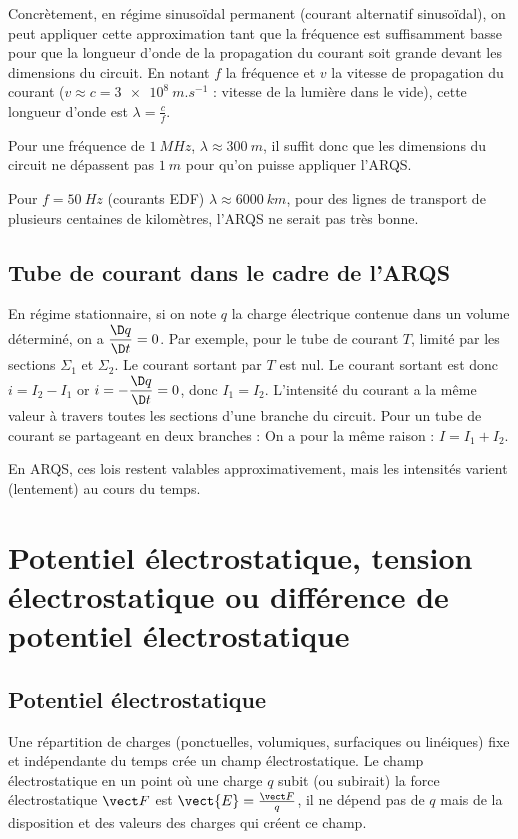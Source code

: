 Concrètement, en régime sinusoïdal permanent (courant alternatif sinusoïdal), on peut appliquer cette approximation tant que la fréquence est suffisamment basse pour que la longueur d'onde de la propagation du courant soit grande devant les dimensions du circuit. En notant $f$ la fréquence et $v$ la vitesse de propagation du courant ($v\approx c = \SI{3e8}{m.s^{-1}}$ : vitesse de la lumière dans le vide), cette longueur d'onde est  $\lambda = \frac{c}{f}$.

Pour une fréquence de $\SI{1}{MHz}$,  $\lambda \approx \SI{300}{m}$, il suffit donc que les dimensions du circuit ne dépassent pas $\SI{1}{m}$ pour qu'on puisse appliquer l'ARQS. 

Pour $f=\SI{50}{Hz}$ (courants EDF) $\lambda \approx \SI{6000}{km}$, pour des lignes de transport de plusieurs centaines de kilomètres, l'ARQS ne serait pas très bonne.

\subsection{Tube de courant dans le cadre de l'ARQS}
\label{chap9-subsec:TubedeCourantARQS}

En régime stationnaire, si on note $q$ la charge électrique contenue dans un volume déterminé, on a $\derived{q}{t}=0$. Par exemple, pour le tube de courant $T$, limité par les sections $\Sigma_1$ et $\Sigma_2$. Le courant sortant par $T$ est nul. Le courant sortant est donc $i = I_2 - I_1$ or $i=-\derived{q}{t}=0$, donc $I_1 = I_2$. L'intensité du courant a la même valeur à travers toutes les sections d'une branche du circuit. Pour un tube de courant se partageant en deux branches : On a pour la même raison : $I = I_1 + I_2$.

En ARQS, ces lois restent valables approximativement, mais les intensités varient (lentement) au cours du temps.

\section{Potentiel électrostatique, tension électrostatique ou différence de potentiel électrostatique}
\label{chap9-sec:potentiel}

\subsection{Potentiel électrostatique}
\label{chap9-subsec:potentiel}

Une répartition de charges (ponctuelles, volumiques, surfaciques ou linéiques) fixe et indépendante du temps crée un champ électrostatique. Le champ électrostatique en un point où une charge $q$ subit (ou subirait) la force électrostatique $\vF$  est $\vect{E} = \frac{\vF}{q}$, il ne dépend pas de $q$ mais de la disposition et des valeurs des charges qui créent ce champ. 

